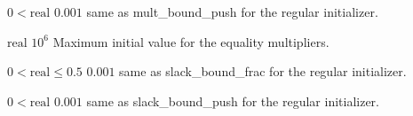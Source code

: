%
{$0<\textrm{real}$}%
{$0.001$}%
{same as mult\_bound\_push for the regular initializer.}%
{}

%
{$\textrm{real}$}%
{$10^{  6}$}%
{Maximum initial value for the equality multipliers.}%
{}

%
{$0<\textrm{real}\leq0.5$}%
{$0.001$}%
{same as slack\_bound\_frac for the regular initializer.}%
{}

%
{$0<\textrm{real}$}%
{$0.001$}%
{same as slack\_bound\_push for the regular initializer.}%
{}

